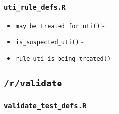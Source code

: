 \documentclass[
]{book}
\providecommand{\tightlist}{%
  \setlength{\itemsep}{0pt}\setlength{\parskip}{0pt}}
\begin{document}
\hypertarget{uti_rule_defs.r-1}{%
\subsubsection{\texorpdfstring{\texttt{uti\_rule\_defs.R}}{uti\_rule\_defs.R}}\label{uti_rule_defs.r-1}}

\begin{itemize}
\tightlist
\item
  \texttt{may\_be\_treated\_for\_uti()} -
\item
  \texttt{is\_suspected\_uti()} -
\item
  \texttt{rule\_uti\_is\_being\_treated()} -
\end{itemize}

\hypertarget{rvalidate-1}{%
\subsection{\texorpdfstring{\texttt{/r/validate}}{/r/validate}}\label{rvalidate-1}}

\hypertarget{validate_test_defs.r-1}{%
\subsubsection{\texorpdfstring{\texttt{validate\_test\_defs.R}}{validate\_test\_defs.R}}\label{validate_test_defs.r-1}}
\end{document}
